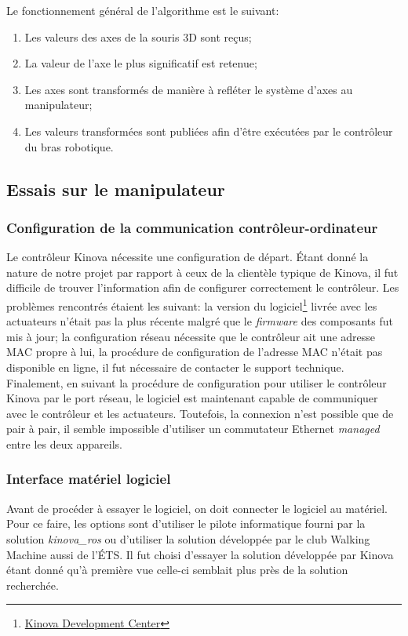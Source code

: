 Le fonctionnement général de l'algorithme est le suivant: 
\begin{enumerate}[nosep]
    \item Les valeurs des axes de la souris 3D sont reçus;
    \item La valeur de l'axe le plus significatif est retenue;
    \item Les axes sont transformés de manière à refléter le système d'axes au manipulateur;
    \item Les valeurs transformées sont publiées afin d'être exécutées par le contrôleur du bras robotique.
\end{enumerate}

\subsection{Essais sur le manipulateur}
\subsubsection{Configuration de la communication contrôleur-ordinateur}
Le contrôleur Kinova nécessite une configuration de départ. Étant donné la nature de notre projet par rapport à ceux de la clientèle typique de Kinova, il fut difficile de trouver l'information afin de configurer correctement le contrôleur. Les problèmes rencontrés étaient les suivant: la version du logiciel\footnote{\href{https://www.kinovarobotics.com/sites/default/files/UG-008_KINOVA_Software_development_kit-User_guide_EN_R02\%20\%281\%29.pdf}{Kinova Development Center}} livrée avec les actuateurs n'était pas la plus récente malgré que le \emph{firmware} %
des composants fut mis à jour; la configuration réseau nécessite que le contrôleur ait une adresse MAC propre à lui, la procédure de configuration de l'adresse MAC n'était pas disponible en ligne, il fut nécessaire de contacter le support technique. Finalement, en suivant la procédure de configuration pour utiliser le contrôleur Kinova par le port réseau, le logiciel est maintenant capable de communiquer avec le contrôleur et les actuateurs. Toutefois, la connexion n'est possible que de pair à pair, il semble impossible d'utiliser un commutateur Ethernet \emph{managed} entre les deux appareils.

\subsubsection{Interface matériel logiciel}
Avant de procéder à essayer le logiciel, on doit connecter le logiciel au matériel. Pour ce faire, les options sont d'utiliser le pilote informatique %
fourni par la solution \emph{kinova\_ros} ou d'utiliser la solution développée par le club Walking Machine aussi de l'ÉTS. Il fut choisi d'essayer la solution développée par Kinova étant donné qu'à première vue celle-ci semblait plus près de la solution recherchée.

